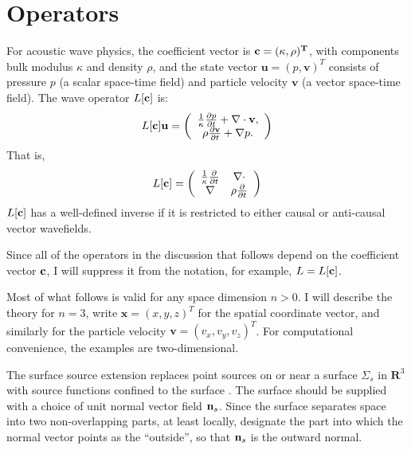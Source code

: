 \documentclass[12pt]{geophysics}
\newcommand{\bx}{\mathbf{x}}
\newcommand{\bv}{\mathbf{v}}
\newcommand{\bu}{\mathbf{u}}
\newcommand{\bR}{\mathbf{R}}
\begin{document}
\section{Operators}

For acoustic wave physics, the coefficient vector is
$\bf{c}=(\kappa,\rho)^T$, with components bulk modulus $\kappa$ and
density $\rho$, and the state vector $\bu=(p,\bv)^T$ consists of
pressure $p$ (a scalar space-time field) and particle velocity $\bv$
(a vector space-time field). The wave operator $L[\bf{c}]$ is:
\begin{equation}
\label{eqn:aweop}
L[\bf{c}]\bf{u} = 
\left(
\begin{array}{c}
\frac{1}{\kappa}\frac{\partial p}{\partial t}  + \nabla \cdot \bv, \\
\rho\frac{\partial \bv}{\partial t} + \nabla p.
\end{array}
\right) 
\end{equation}
That is,
\begin{equation}
  \label{eqn:awemat}
  L[{\bf c}] = \left(
    \begin{array}{cc}
      \frac{1}{\kappa}\frac{\partial}{\partial t} & \nabla \cdot \\
      \nabla & \rho \frac{\partial}{\partial t}
    \end{array}
  \right)
\end{equation}
$L[{\bf c}]$ has a well-defined inverse %
if it is restricted to either causal or anti-causal vector wavefields.

Since all of the operators in the discussion that follows depend on
the coefficient vector $\bf{c}$, I will suppress it from the notation,
for example, $L=L[\bf{c}]$.

Most of what follows is valid for any space dimension $n >0$. I will
describe the theory for $n=3$, write $\bx=(x,y,z)^T$ for the spatial
coordinate vector, and similarly for the 
particle velocity $\bv = (v_x,v_y,v_z)^T$. For computational convenience, the
examples are two-dimensional.

The surface source extension replaces point sources on or near a
surface $\Sigma_s$ in $\bR^3$ with source functions confined to the
surface . The surface should be supplied with a choice of unit normal
vector field ${\bf n}_s$. Since the surface separates space into two
non-overlapping parts, at least locally, designate the part into which
the normal vector points as the ``outside'', so that ${\bf n}_s$ is
the outward normal.
\end{document}
